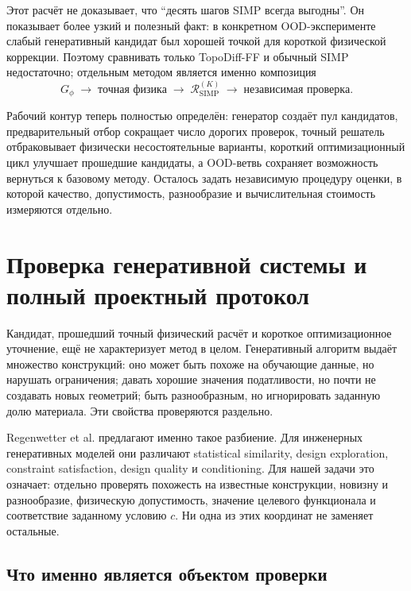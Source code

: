 Этот расчёт не доказывает, что ``десять шагов SIMP всегда выгодны''. Он показывает более узкий и полезный факт: в конкретном OOD-эксперименте слабый генеративный кандидат был хорошей точкой для короткой физической коррекции. Поэтому сравнивать только TopoDiff-FF и обычный SIMP недостаточно; отдельным методом является именно композиция
\begin{equation}
 \boxed{
  G_\phi
  \;\longrightarrow\;
  \text{точная физика}
  \;\longrightarrow\;
  \mathcal R_{\mathrm{SIMP}}^{(K)}
  \;\longrightarrow\;
  \text{независимая проверка}
 }.
\end{equation}

Рабочий контур теперь полностью определён: генератор создаёт пул кандидатов, предварительный отбор сокращает число дорогих проверок, точный решатель отбраковывает физически несостоятельные варианты, короткий оптимизационный цикл улучшает прошедшие кандидаты, а OOD-ветвь сохраняет возможность вернуться к базовому методу. Осталось задать независимую процедуру оценки, в которой качество, допустимость, разнообразие и вычислительная стоимость измеряются отдельно.

\section{Проверка генеративной системы и полный проектный протокол}

Кандидат, прошедший точный физический расчёт и короткое оптимизационное уточнение, ещё не характеризует метод в целом. Генеративный алгоритм выдаёт множество конструкций: оно может быть похоже на обучающие данные, но нарушать ограничения; давать хорошие значения податливости, но почти не создавать новых геометрий; быть разнообразным, но игнорировать заданную долю материала. Эти свойства проверяются раздельно.

Regenwetter et al. предлагают именно такое разбиение. Для инженерных генеративных моделей они различают statistical similarity, design exploration, constraint satisfaction, design quality и conditioning. Для нашей задачи это означает: отдельно проверять похожесть на известные конструкции, новизну и разнообразие, физическую допустимость, значение целевого функционала и соответствие заданному условию $c$. Ни одна из этих координат не заменяет остальные.

\subsection{Что именно является объектом проверки}

